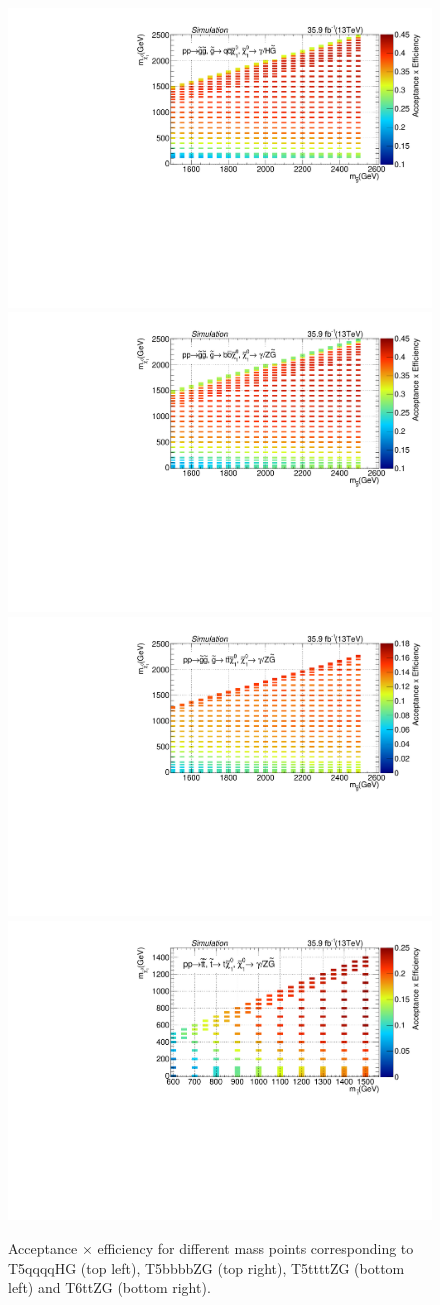 \begin{figure}[h!]
\centering
\includegraphics[width=0.46\linewidth]{../Figures/Chap3/optimization/T5qqqqHg_AccEff.pdf} \xspace
\includegraphics[width=0.46\linewidth]{../Figures/Chap3/optimization/T5bbbbZg_AccEff.pdf}\\
\includegraphics[width=0.46\linewidth]{../Figures/Chap3/optimization/T5ttttZg_AccEff.pdf} \xspace
\includegraphics[width=0.46\linewidth]{../Figures/Chap3/optimization/T6ttZg_AccEff.pdf}
\caption[Acceptance $\times$ efficiency for signal]{Acceptance $\times$ efficiency for different mass points corresponding to T5qqqqHG (top left), T5bbbbZG (top right), T5ttttZG (bottom left) and T6ttZG (bottom right).}
\label{fig:sigEff}
\end{figure}